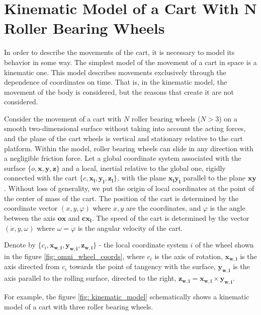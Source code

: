 \documentclass[oneside,final,14pt]{extreport}
\newcommand{\bs}{\boldsymbol}
\begin{document}
\chapter{Kinematic Model of a Cart With N Roller Bearing  Wheels}
In order to describe the movements of the cart, it is necessary to model its behavior in some way. The simplest model of the movement of a cart in space is a kinematic one. This model describes movements exclusively through the dependence of coordinates on time. That is, in the kinematic model, the movement of the body is considered, but the reasons that create it are not considered.

Consider the movement of a cart with $ N $ roller bearing  wheels ($ N> 3 $) on a smooth two-dimensional surface without taking into account the acting forces, and the plane of the cart wheels is vertical and stationary relative to the cart platform. Within the model, roller bearing  wheels can slide in any direction with a negligible friction force. Let a global coordinate system associated with the surface $ \{o, \boldsymbol{x}, \bs{y}, \bs{z} \} $ and a local, inertial relative to the global one, rigidly connected with the cart $ \{c, \bs{x_{l}}, \bs{y_{l}}, \bs{z_{l}} \} $, with the plane $ \bs{x_{l}} \bs{y_{l}} $ parallel to the plane $ \bs{x} \bs{y} $. Without loss of generality, we put the origin of local coordinates at the point of the center of mass of the cart. The position of the cart is determined by the coordinate vector $ (x, y, \varphi) $
where $ x, y $ are the coordinates, and $ \varphi $ is the angle between the axis $ \bs{ox} $ and $ \bs{cx_{l}} $. The speed of the cart is determined by the vector $ (\dot{x}, \dot{y}, \omega) $ where $ \omega = \dot{\varphi} $ is the angular velocity of the cart.

Denote by $ \{c_{i}, \bs{x_{w, i}}, \bs{y_{w, i}}, \bs{z_{w, i}} \} $ - the local coordinate system $ i $ of the wheel shown in the figure \ref{fig: omni_wheel_coords}, where $ c_{i} $ is the axis of rotation, $ \bs{x_{w, i}} $ is the axis directed from $ c_{i} $ towards the point of tangency with the surface, $ \bs{y_{w, i}} $ is the axis parallel to the rolling surface, directed to the right, $ \bs{z_{w, i}} = \bs{x_{w, i }} \times \bs{y_{w, i}} $.

For example, the figure \ref{fig: kinematic_model} schematically shows a kinematic model of a cart with three roller bearing  wheels.


\begin{figure} [H]
\end{figure}
\end{document}
